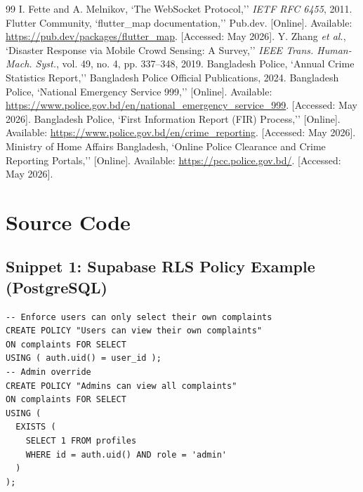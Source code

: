 \documentclass[12pt, a4paper, twoside, openany]{report}
\begin{document}
\begin{thebibliography}{99}
 I. Fette and A. Melnikov, `The WebSocket Protocol,'' \textit{IETF RFC 6455}, 2011.
 Flutter Community, `flutter\_map documentation,'' Pub.dev. [Online]. Available: \url{https://pub.dev/packages/flutter_map}. [Accessed: May 2026].
 Y. Zhang \textit{et al.}, `Disaster Response via Mobile Crowd Sensing: A Survey,'' \textit{IEEE Trans. Human-Mach. Syst.}, vol. 49, no. 4, pp. 337--348, 2019.
 Bangladesh Police, `Annual Crime Statistics Report,'' Bangladesh Police Official Publications, 2024.
 Bangladesh Police, `National Emergency Service 999,'' [Online]. Available: \url{https://www.police.gov.bd/en/national_emergency_service_999}. [Accessed: May 2026].
 Bangladesh Police, `First Information Report (FIR) Process,'' [Online]. Available: \url{https://www.police.gov.bd/en/crime_reporting}. [Accessed: May 2026].
 Ministry of Home Affairs Bangladesh, `Online Police Clearance and Crime Reporting Portals,'' [Online]. Available: \url{https://pcc.police.gov.bd/}. [Accessed: May 2026].
\end{thebibliography}
\appendix
{}
\chapter{Source Code}
\section*{Snippet 1: Supabase RLS Policy Example (PostgreSQL)}
\begin{footnotesize}
\begin{verbatim}
-- Enforce users can only select their own complaints
CREATE POLICY "Users can view their own complaints"
ON complaints FOR SELECT
USING ( auth.uid() = user_id );
-- Admin override
CREATE POLICY "Admins can view all complaints"
ON complaints FOR SELECT
USING ( 
  EXISTS (
    SELECT 1 FROM profiles 
    WHERE id = auth.uid() AND role = 'admin'
  )
);
\end{verbatim}
\end{footnotesize}
\vspace{1cm}
\end{document}
